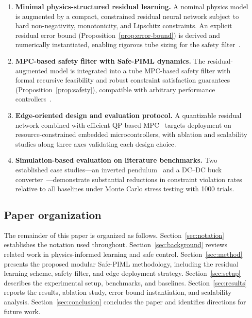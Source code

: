 \documentclass[12pt,a4paper]{article}
\begin{document}
\begin{enumerate}
  \item \textbf{Minimal physics-structured residual learning.}
  A nominal physics model is augmented by a compact, constrained
  residual neural network subject to hard non-negativity, monotonicity,
  and Lipschitz constraints. An explicit residual error bound
  (Proposition~\ref{prop:error-bound}) is derived and numerically
  instantiated, enabling rigorous tube sizing for the safety
  filter~\cite{nghiem2023piml,rackauckas2021ude,shi2022residualDyn}.

  \item \textbf{MPC-based safety filter with Safe-PIML dynamics.}
  The residual-augmented model is integrated into a tube MPC-based
  safety filter with formal recursive feasibility and robust constraint
  satisfaction guarantees (Proposition~\ref{prop:safety}), compatible
  with arbitrary performance
  controllers~\cite{mayne2005robust,wabersich2021psf,gros2022learning}.

  \item \textbf{Edge-oriented design and evaluation protocol.}
  A quantizable residual network combined with efficient QP-based
  MPC~\cite{stellato2020osqp,liang2021pruning} targets deployment on
  resource-constrained embedded microcontrollers, with ablation and
  scalability studies along three axes validating each design choice.

  \item \textbf{Simulation-based evaluation on literature benchmarks.}
  Two established case studies---an inverted
  pendulum~\cite{wabersich2021psf} and a DC--DC buck
  converter~\cite{schwan2023evanqp}---demonstrate substantial
  reductions in constraint violation rates relative to all baselines
  under Monte Carlo stress testing with 1000 trials.
\end{enumerate}

\subsection{Paper organization}
\label{subsec:organization}

The remainder of this paper is organized as follows.
Section~\ref{sec:notation} establishes the notation used throughout.
Section~\ref{sec:background} reviews related work in physics-informed
learning and safe control. Section~\ref{sec:method} presents the
proposed modular Safe-PIML methodology, including the residual learning
scheme, safety filter, and edge deployment strategy.
Section~\ref{sec:setup} describes the experimental setup, benchmarks,
and baselines. Section~\ref{sec:results} reports the results, ablation
study, error bound instantiation, and scalability analysis.
Section~\ref{sec:conclusion} concludes the paper and identifies
directions for future work.
\end{document}
